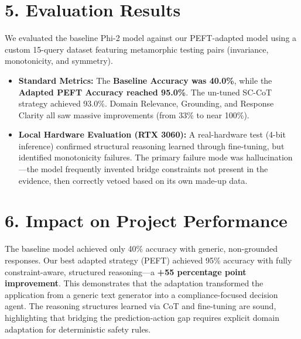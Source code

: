\documentclass[11pt,a4paper]{article}
\begin{document}
\section*{5. Evaluation Results}
We evaluated the baseline Phi-2 model against our PEFT-adapted model using a custom 15-query dataset featuring metamorphic testing pairs (invariance, monotonicity, and symmetry).
\begin{itemize}[leftmargin=*, noitemsep]
    \item \textbf{Standard Metrics:} The \textbf{Baseline Accuracy was 40.0\%}, while the \textbf{Adapted PEFT Accuracy reached 95.0\%}. The un-tuned SC-CoT strategy achieved 93.0\%. Domain Relevance, Grounding, and Response Clarity all saw massive improvements (from 33\% to near 100\%).
    \item \textbf{Local Hardware Evaluation (RTX 3060):} A real-hardware test (4-bit inference) confirmed structural reasoning learned through fine-tuning, but identified monotonicity failures. The primary failure mode was hallucination—the model frequently invented bridge constraints not present in the evidence, then correctly vetoed based on its own made-up data.
\end{itemize}

\section*{6. Impact on Project Performance}
The baseline model achieved only 40\% accuracy with generic, non-grounded responses. Our best adapted strategy (PEFT) achieved 95\% accuracy with fully constraint-aware, structured reasoning—a \textbf{+55 percentage point improvement}. This demonstrates that the adaptation transformed the application from a generic text generator into a compliance-focused decision agent. The reasoning structures learned via CoT and fine-tuning are sound, highlighting that bridging the prediction-action gap requires explicit domain adaptation for deterministic safety rules.
\end{document}
